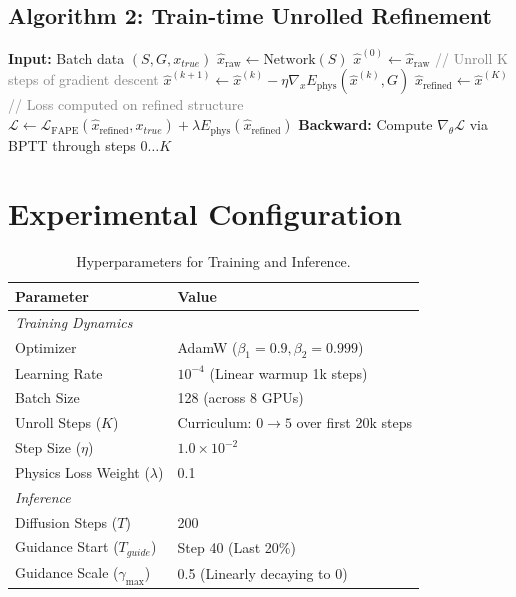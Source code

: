 \documentclass[twocolumn,10pt]{article}
\begin{document}
\begin{appendices}
\subsection{Algorithm 2: Train-time Unrolled Refinement}
\begin{algorithm}[H]
\caption{Training Step with Unrolling (Strategy II)}
\label{alg:training}
\begin{algorithmic}[1]
\State \textbf{Input:} Batch data $(S, G, x_{true})$
\State $\hat{x}_{\text{raw}} \gets \text{Network}(S)$ 
\State $\hat{x}^{(0)} \gets \hat{x}_{\text{raw}}$
\State \textcolor{gray}{// Unroll K steps of gradient descent}
    \State $\hat{x}^{(k+1)} \gets \hat{x}^{(k)} - \eta \nabla_x E_{\mathrm{phys}}(\hat{x}^{(k)}, G)$
\EndFor
\State $\hat{x}_{\text{refined}} \gets \hat{x}^{(K)}$
\State \textcolor{gray}{// Loss computed on refined structure}
\State $\mathcal{L} \gets \mathcal{L}_{\text{FAPE}}(\hat{x}_{\text{refined}}, x_{true}) + \lambda E_{\mathrm{phys}}(\hat{x}_{\text{refined}})$
\State \textbf{Backward:} Compute $\nabla_\theta \mathcal{L}$ via BPTT through steps $0 \dots K$
\end{algorithmic}
\end{algorithm}

\section{Experimental Configuration}\label{secA3}

\begin{table}[h]
\centering
\caption{Hyperparameters for Training and Inference.}
\label{tab:hyperparams}
\begin{tabular}{ll}
\toprule
\textbf{Parameter} & \textbf{Value} \\
\midrule
\multicolumn{2}{l}{\textit{Training Dynamics}} \\
Optimizer & AdamW ($\beta_1=0.9, \beta_2=0.999$) \\
Learning Rate & $10^{-4}$ (Linear warmup 1k steps) \\
Batch Size & 128 (across 8 GPUs) \\
Unroll Steps ($K$) & Curriculum: $0 \to 5$ over first 20k steps \\
Step Size ($\eta$) & $1.0 \times 10^{-2}$ \\
Physics Loss Weight ($\lambda$) & 0.1 \\
\midrule
\multicolumn{2}{l}{\textit{Inference}} \\
Diffusion Steps ($T$) & 200 \\
Guidance Start ($T_{guide}$) & Step 40 (Last 20\%) \\
Guidance Scale ($\gamma_{\max}$) & 0.5 (Linearly decaying to 0) \\
\bottomrule
\end{tabular}
\end{table}

\end{appendices}
\end{document}
